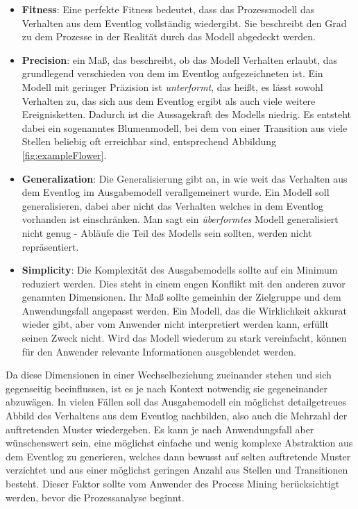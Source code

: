 \begin{itemize}
\item \textbf{Fitness}: Eine perfekte Fitness bedeutet, dass das Prozessmodell das Verhalten aus dem Eventlog vollständig wiedergibt. Sie beschreibt den Grad zu dem Prozesse in der Realität durch das Modell abgedeckt werden.
 
\item \textbf{Precision}: ein Maß, das beschreibt, ob das Modell Verhalten erlaubt, das grundlegend verschieden von dem im Eventlog aufgezeichneten ist. Ein Modell mit geringer Präzision ist \textit{unterformt}, das heißt, es lässt sowohl Verhalten zu, das sich aus dem Eventlog ergibt als auch viele weitere Ereignisketten. Dadurch ist die Aussagekraft des Modells niedrig. Es entsteht dabei ein sogenanntes Blumenmodell, bei dem von einer Transition aus viele Stellen beliebig oft erreichbar sind, entsprechend Abbildung \ref{fig:exampleFlower}.

\item \textbf{Generalization}: Die Generalisierung gibt an, in wie weit das Verhalten aus dem Eventlog im Ausgabemodell verallgemeinert wurde. Ein Modell soll generalisieren, dabei aber nicht das Verhalten welches in dem Eventlog vorhanden ist einschränken. Man sagt ein \textit{überformtes} Modell generalisiert nicht genug - Abläufe die Teil des Modells sein sollten, werden nicht repräsentiert.

\item \textbf{Simplicity}: Die Komplexität des Ausgabemodells sollte auf ein Minimum reduziert werden. Dies steht in einem engen Konflikt mit den anderen zuvor genannten Dimensionen. Ihr Maß sollte gemeinhin der Zielgruppe und dem Anwendungsfall angepasst werden. Ein Modell, das die Wirklichkeit akkurat wieder gibt, aber vom Anwender nicht interpretiert werden kann, erfüllt seinen Zweck nicht. Wird das Modell wiederum zu stark vereinfacht, können für den Anwender relevante Informationen ausgeblendet werden.
\end{itemize}

Da diese Dimensionen in einer Wechselbeziehung zueinander stehen und sich gegenseitig beeinflussen, ist es je nach Kontext notwendig sie gegeneinander abzuwägen. In vielen Fällen soll das Ausgabemodell ein möglichst detailgetreues Abbild des Verhaltens aus dem Eventlog nachbilden, also auch die Mehrzahl der auftretenden Muster wiedergeben. 
Es kann je nach Anwendungsfall aber wünschenswert sein, eine möglichst einfache und wenig komplexe Abstraktion aus dem Eventlog zu generieren, welches dann bewusst auf selten auftretende Muster verzichtet und aus einer möglichst geringen Anzahl aus Stellen und Transitionen besteht. Dieser Faktor sollte vom Anwender des Process Mining berücksichtigt werden, bevor die Prozessanalyse beginnt.

